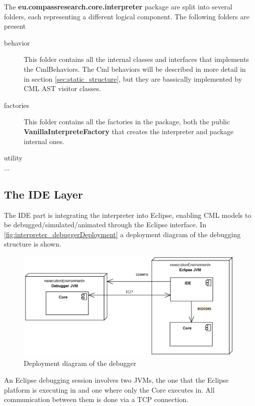 \documentclass[a4paper, 10pt]{include/compassreport}   %
\begin{document}
The \textbf{eu.compassresearch.core.interpreter} package are split into several
folders, each representing a different logical component. The
following folders are present

\begin{description}
\item[behavior] This folder contains all the internal classes and
  interfaces that implements the CmlBehaviors. The Cml behaviors will be
  described in more detail in in section \ref{sec:static_structure}, but
  they are bassically implemented by CML AST visitor classes.
\item[factories] This folder contains all the factories in the
  package, both the public \textbf{VanillaInterpreteFactory} that
  creates the interpreter and package internal ones.
\item[utility]
\item[...]
\end{description}

\subsection{The IDE Layer}

The IDE part is integrating the interpreter into Eclipse, enabling CML
models to be debugged/simulated/animated through the Eclipse
interface. In \autoref{fig:interpreter_debuggerDeployment} a
deployment diagram of the debugging structure is shown.

\begin{figure}[ht!]
  \begin{center}
    \includegraphics[width=1\textwidth]{figures/DebuggerDeploymentView}
    \caption{Deployment diagram of the debugger}
    \label{fig:interpreter_debuggerDeployment}
   \end{center}
\end{figure}

An Eclipse debugging session involves two JVMs, the one that the Eclipse
platform is executing in and one where only the Core executes in. All
communication between them is done via a TCP connection. 
\end{document}
